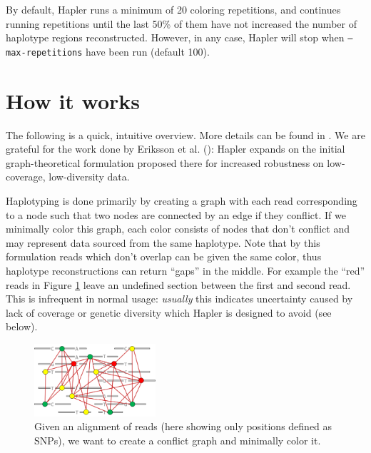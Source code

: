 \documentclass[11pt]{llncs}
\begin{document}
By default, Hapler runs a minimum of 20 coloring repetitions, and continues running repetitions until the last 50\% of them have not
increased the number of haplotype regions reconstructed. However, in any case, Hapler will stop when \texttt{--max-repetitions} have 
been run (default 100).



 
\newpage

\section{How it works}
\label{howItWorks}

The following is a quick, intuitive overview. More details can be found in \cite{ONEIL2011}. We are grateful for the work done by Eriksson et al. 
(\cite{ERIKSSON2008}): Hapler expands on the initial graph-theoretical formulation proposed there for increased robustness on low-coverage, low-diversity
data.

Haplotyping is done primarily by creating a graph with each read corresponding to a node such that two nodes are connected by an edge if they conflict. If 
we minimally color this graph, each color consists of nodes that don't conflict and may represent data sourced from the same haplotype. Note that by this 
formulation reads which don't overlap can be given the same color, thus haplotype reconstructions can return ``gaps'' in the middle. For example the
``red'' reads in Figure \ref{exampleConflictGraph} leave an undefined section between the first and second read. This is infrequent in normal usage: 
\emph{usually} this indicates uncertainty caused by lack of coverage or genetic diversity which Hapler is designed to avoid (see below).

\begin{figure}[!h]
\centering
   \includegraphics[width=0.4\textwidth]{graphics/mincolor}
   \caption{Given an alignment of reads (here showing only positions defined as SNPs), we want to create a conflict graph and minimally color it.}
   \label{exampleConflictGraph}
\end{figure}
\end{document}
